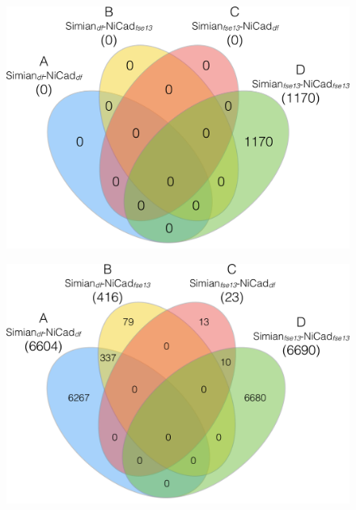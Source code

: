 \documentclass{IEEEtran}
\begin{document}
\begin{figure}
	\centering
	\begin{minipage}{.5\textwidth}
		\centering
		\includegraphics[width=0.9\linewidth]{venn4_pairs_good_new}
		\label{fig:venn4_new_good}
	\end{minipage}%
	\begin{minipage}{.5\textwidth}
		\centering
		\includegraphics[width=0.9\linewidth]{venn4_pairs_ok_new}
		\label{fig:venn4_new_ok}
	\end{minipage}
\end{figure}

\end{document}

